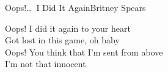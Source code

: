 \begin{song}{Oops!\dots\ I Did It Again}{Britney Spears}
\begin{guitar}
Oops! I did it again to your heart\\
Got lost in this game, oh baby\\
Oops! You think that I'm sent from above\\
I'm not that innocent\\
\end{guitar}

\end{song}
